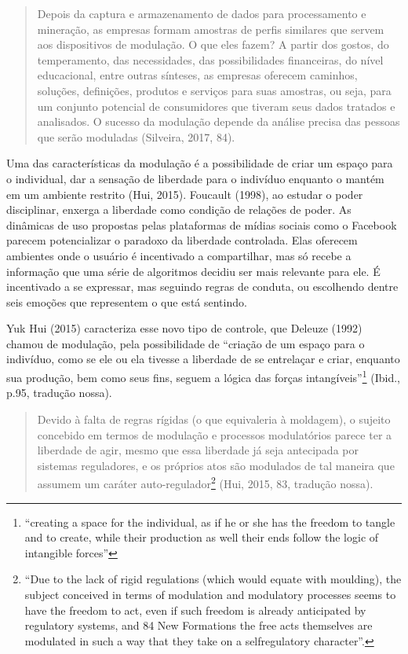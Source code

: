 \begin{quote}
Depois da captura e armazenamento de dados para processamento e
mineração, as empresas formam amostras de perfis similares que servem
aos dispositivos de modulação. O que eles fazem? A partir dos gostos, do
temperamento, das necessidades, das possibilidades financeiras, do nível
educacional, entre outras sínteses, as empresas oferecem caminhos,
soluções, definições, produtos e serviços para suas amostras, ou seja,
para um conjunto potencial de consumidores que tiveram seus dados
tratados e analisados. O sucesso da modulação depende da análise precisa
das pessoas que serão moduladas (Silveira, 2017, 84).
\end{quote}

Uma das características da modulação é a possibilidade de criar um
espaço para o individual, dar a sensação de liberdade para o indivíduo
enquanto o mantém em um ambiente restrito (Hui, 2015).
Foucault (1998), ao estudar o poder disciplinar, enxerga a liberdade como condição de
relações de poder. As dinâmicas de uso propostas pelas plataformas de
mídias sociais como o Facebook parecem potencializar o paradoxo da
liberdade controlada. Elas oferecem ambientes onde o usuário é
incentivado a compartilhar, mas só recebe a informação que uma série de
algoritmos decidiu ser mais relevante para ele. É incentivado a se
expressar, mas seguindo regras de conduta, ou escolhendo dentre seis
emoções que representem o que está sentindo.

Yuk Hui (2015) caracteriza esse novo tipo de controle, que Deleuze
(1992) chamou de modulação, pela possibilidade de ``criação de um espaço
para o indivíduo, como se ele ou ela tivesse a liberdade de se
entrelaçar e criar, enquanto sua produção, bem como seus fins, seguem a
lógica das forças intangíveis''\footnote{``creating a space for the
  individual, as if he or she has the freedom to tangle and to create,
  while their production as well their ends follow the logic of
  intangible forces''} (Ibid., p.95, tradução nossa).

\begin{quote}
Devido à falta de regras rígidas (o que equivaleria à moldagem), o
sujeito concebido em termos de modulação e processos modulatórios parece
ter a liberdade de agir, mesmo que essa liberdade já seja antecipada por
sistemas reguladores, e os próprios atos são modulados de tal maneira
que assumem um caráter auto-regulador\footnote{``Due to the lack of
  rigid regulations (which would equate with moulding), the subject
  conceived in terms of modulation and modulatory processes seems to
  have the freedom to act, even if such freedom is already anticipated
  by regulatory systems, and 84 New Formations the free acts themselves
  are modulated in such a way that they take on a selfregulatory
  character''.}
 (Hui, 2015, 83, tradução nossa).
\end{quote}

